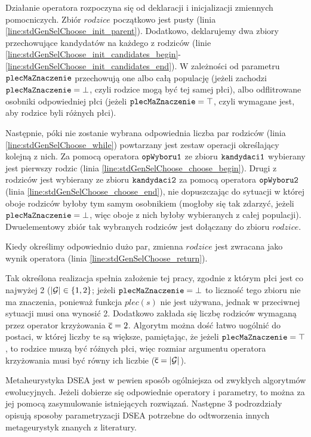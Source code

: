 \documentclass[./FM_mgr.tex]{subfiles}
\begin{document}
Działanie operatora rozpoczyna się od deklaracji i inicjalizacji zmiennych pomocniczych.
Zbiór $rodzice$ początkowo jest pusty (linia \ref{line:stdGenSelChoose_init_parent}).
Dodatkowo, deklarujemy dwa zbiory przechowujące kandydatów na każdego z rodziców (linie \ref{line:stdGenSelChoose_init_candidates_begin}-\ref{line:stdGenSelChoose_init_candidates_end}).
W zależności od parametru $\mathtt{plecMaZnaczenie}$ przechowują one albo całą populację (jeżeli zachodzi $\mathtt{plecMaZnaczenie} = \bot$, czyli rodzice mogą być tej samej płci), albo odflitrowane osobniki odpowiedniej płci (jeżeli $\mathtt{plecMaZnaczenie} = \top$, czyli wymagane jest, aby rodzice byli różnych płci).

Następnie, póki nie zostanie wybrana odpowiednia liczba par rodziców (linia \ref{line:stdGenSelChoose_while}) powtarzany jest zestaw operacji określający kolejną z nich.
Za pomocą operatora $\mathtt{opWyboru1}$ ze zbioru $\mathtt{kandydaci1}$ wybierany jest pierwszy rodzic (linia \ref{line:stdGenSelChoose_choose_begin}).
Drugi z rodziców jest wybierany ze zbioru $\mathtt{kandydaci2}$ za pomocą operatora $\mathtt{opWyboru2}$  (linia \ref{line:stdGenSelChoose_choose_end}), nie dopuszczając do sytuacji w której oboje rodziców byłoby tym samym osobnikiem (mogłoby się tak zdarzyć, jeżeli $\mathtt{plecMaZnaczenie} = \bot$, więc oboje z nich byłoby wybieranych z całej populacji).
Dwuelementowy zbiór tak wybranych rodziców jest dołączany do zbioru $rodzice$.


Kiedy określimy odpowiednio dużo par, zmienna $rodzice$ jest zwracana jako wynik operatora (linia \ref{line:stdGenSelChoose_return}).

Tak określona realizacja spełnia założenie tej pracy, zgodnie z którym płci jest co najwyżej 2 ($|\mathcal{G}| \in \{ 1, 2 \}$; jeżeli $\mathtt{plecMaZnaczenie} = \bot$ to liczność tego zbioru nie ma znaczenia, ponieważ funkcja $plec(s)$ nie jest używana, jednak w przeciwnej sytuacji musi ona wynosić 2.
Dodatkowo zakłada się liczbę rodziców wymaganą przez operator krzyżowania $\mathsf{\overline{c}}=2$.
Algorytm można dość łatwo uogólnić do postaci, w której liczby te są większe, pamiętając, że jeżeli $\mathtt{plecMaZnaczenie} = \top$, to rodzice muszą być różnych płci, więc rozmiar argumentu operatora krzyżowania musi być równy ich liczbie ($\mathsf{\overline{c}} = |\mathcal{G}|$).

\newpage

Metaheurystyka DSEA jest w pewien sposób ogólniejsza od zwykłych algorytmów ewolucyjnych.
Jeżeli dobierze się odpowiednie operatory i parametry, to można za jej pomocą zasymulowanie istniejących rozwiązań.
Następne 3 podrozdziały opisują sposoby parametryzacji DSEA potrzebne do odtworzenia innych metageurystyk znanych z literatury.
\end{document}
